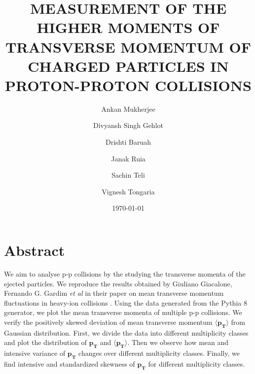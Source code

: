 \documentclass[letterpaper,aps,prc,superscriptaddress,nofootinbib,10pt,showpacs,floatfix]{revtex4-2}%
\begin{document}
\title{MEASUREMENT OF THE HIGHER MOMENTS OF TRANSVERSE MOMENTUM OF CHARGED PARTICLES IN PROTON-PROTON COLLISIONS}
\author{Ankan Mukherjee} 
\author{Divyansh Singh Gehlot}
\author{Drishti Baruah}
\author{Janak Ruia}
\author{Sachin Teli}
\author{Vignesh Tongaria}




\date{\today}  



\maketitle
\vspace{-10mm}
\section*{Abstract}
\vspace{-2mm}
\begin{adjustwidth}{20pt}{20pt}
We aim to analyse p-p collisions by the studying the transverse momenta of the ejected particles. We reproduce the results obtained by Giuliano Giacalone, Fernando G. Gardim {\it et al} in their paper on mean transverse momentum fluctuations in heavy-ion collisions \cite{fluct}. Using the data generated from the Pythia 8 generator, we plot the mean transverse momenta of multiple p-p collisions. We verify the positively skewed deviation of mean transverse momentum $\mathbf{\langle p_T \rangle}$  from Gaussian distribution. First, we divide the data into different multiplicity classes and plot the distribution of $\mathbf{p_T}$ and $\mathbf{\langle  p_T\rangle}$. Then we observe how mean and intensive variance of $\mathbf{p_T}$ changes over different multiplicity classes. Finally, we find intensive and standardized skewness of $\mathbf{p_T}$ for different multiplicity classes. 
\end{adjustwidth}
\end{document}
